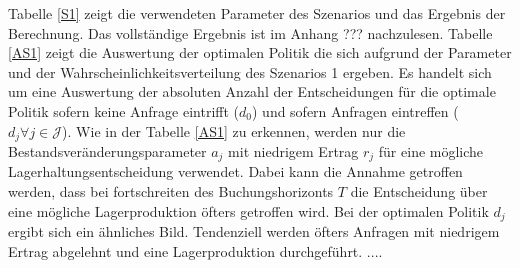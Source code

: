 Tabelle \ref{S1} zeigt die verwendeten Parameter des Szenarios und das Ergebnis der Berechnung. Das vollständige Ergebnis ist im Anhang ??? nachzulesen. Tabelle \ref{AS1} zeigt die Auswertung der optimalen Politik die sich aufgrund der Parameter und der Wahrscheinlichkeitsverteilung des Szenarios 1 ergeben. Es handelt sich um eine Auswertung der absoluten Anzahl der Entscheidungen für die optimale Politik sofern keine Anfrage eintrifft ($d_0$) und sofern Anfragen eintreffen ($d_j\forall j \in\mathcal{J}$). Wie in der Tabelle \ref{AS1} zu erkennen, werden nur die Bestandsveränderungsparameter $a_j$ mit niedrigem Ertrag $r_j$ für eine mögliche Lagerhaltungsentscheidung verwendet. Dabei kann die Annahme getroffen werden, dass bei fortschreiten des Buchungshorizonts $T$ die Entscheidung über eine mögliche Lagerproduktion öfters getroffen wird. Bei der optimalen Politik $d_j$ ergibt sich ein ähnliches Bild. Tendenziell werden öfters Anfragen mit niedrigem Ertrag abgelehnt und eine Lagerproduktion durchgeführt. ....

















